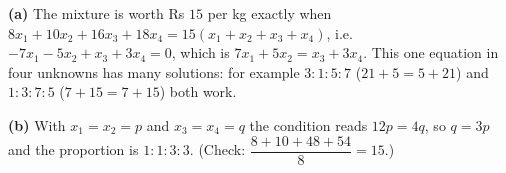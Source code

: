 \textbf{(a)} The mixture is worth Rs $15$ per kg exactly when $8x_1+10x_2+16x_3+18x_4=15\left(x_1+x_2+x_3+x_4\right)$, i.e. $-7x_1-5x_2+x_3+3x_4=0$, which is $7x_1+5x_2=x_3+3x_4$. This one equation in four unknowns has many solutions: for example $3:1:5:7$ ($21+5=5+21$) and $1:3:7:5$ ($7+15=7+15$) both work.

\textbf{(b)} With $x_1=x_2=p$ and $x_3=x_4=q$ the condition reads $12p=4q$, so $q=3p$ and the proportion is $\boxed{1:1:3:3}$. (Check: $\dfrac{8+10+48+54}{8}=15$.)
